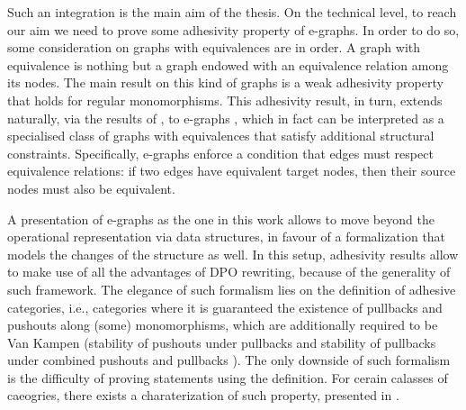 Such an integration is the main aim of the thesis.
 On the technical level, to reach our aim we need to prove some adhesivity property of e-graphs. 
 In order to do so, some consideration on graphs with equivalences are in order. 
 A graph with equivalence is nothing but a graph endowed with an equivalence relation among its nodes. 
 The main result on this kind of graphs is a weak adhesivity property that holds for regular monomorphisms. 
%
%
%
This adhesivity result, in turn, extends naturally, via the results of \cite{castelnovo2022newcriterionmathcalmmathcalnadhesivity}, to e-graphs , which in fact can be interpreted as a specialised class of graphs with equivalences that satisfy additional structural constraints. Specifically, e-graphs enforce a condition that edges must respect equivalence relations: if two edges have equivalent target nodes, then their source nodes must also be equivalent.

\iffalse 
A presentation of e-graphs as the one in this work allows to move beyond the operational representation via data structures, in favour of a formalization that models the changes of the structure as well.
In this setup, adhesivity results allow to make use of all the advantages of DPO rewriting, because of the generality of such framework.
The elegance of such formalism lies on the definition of adhesive categories, i.e., categories where it is guaranteed the existence of pullbacks and pushouts along (some) monomorphisms, which are additionally required to be Van Kampen (stability of pushouts under pullbacks and stability of pullbacks under combined pushouts and pullbacks \cite{Ehrig_Golas}).
The only downside of such formalism is the difficulty of proving statements using the definition. 
For cerain calasses of caeogries, there exists a charaterization of such property, presented in \cite{castelnovo2022newcriterionmathcalmmathcalnadhesivity}.


